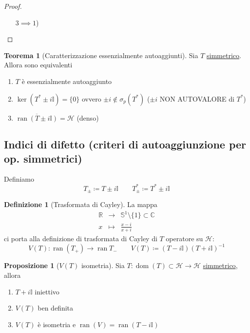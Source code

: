 \documentclass[a4paper,10pt]{article}
\theoremstyle{definition}
\DeclareMathOperator*{\ran}{ran}
\DeclareMathOperator*{\dom}{dom} %
\newcommand{\re}{\mathbb{R}} %
\newcommand{\im}{\mathbb{C}} %
\newcommand{\hil}{\mathcal{H}} %
\theoremstyle{indentdefinition}
\newtheorem{defn}{Definizione}[section]
\theoremstyle{indenttheorem}
\newtheorem{thm}{Teorema}
\newtheorem{prop}{Proposizione}
\theoremstyle{myremark}
\theoremstyle{indentgeneral}
\newenvironment{myboxed} 
{\noindent\begin{lrbox}{\mybox}\begin{minipage}{\textwidth}}
{\end{minipage}\end{lrbox}\fbox{\usebox{\mybox}}}
\begin{document}
\begin{proof}
\begin{itemize}
        \item[$3\implies 1$)] \todo{}
    \end{itemize}
\end{proof}

\begin{thm}[Caratterizzazione essenzialmente autoaggiunti]
    Sia $T$ \underline{simmetrico}. Allora sono equivalenti
    \begin{enumerate}
        \item $T$ è essenzialmente autoaggiunto
        \item $\ker(T^*\pm i\mathbb{I})=\{0\}$ ovvero $\pm i \notin \sigma_p(T^*)$ ($\pm i$ NON AUTOVALORE di $T^*$)
        \item $\overline{\ran(T\pm i\mathbb{I})}=\hil$ (denso)
    \end{enumerate}
\end{thm}

\subsection{Indici di difetto (criteri di autoaggiunzione per op. simmetrici)}
Definiamo
$$T_\pm\coloneqq T\pm i \mathbb{I}\qquad T^*_\pm\coloneqq T^*\pm i \mathbb{I}$$
\begin{defn}[Trasformata di Cayley]
    La mappa 
    $$\begin{array}{ccc}
       \re & \to & \mathbb{S}^1\setminus\{1\}\subset\im   \\
         x&\mapsto & \frac{x-i}{x+i} 
    \end{array}$$
    ci porta alla definizione di trasformata di Cayley di $T$ operatore su $\hil$:
    $$V(T): \ran(T_+)\to\ran T_-\qquad V(T)\coloneqq (T-i\mathbb{I})(T+i\mathbb{I})^{-1}$$
\end{defn}

\begin{myboxed}
    \begin{prop}[$V(T)$ isometria]\label{prop-trasformata-isometria}
        Sia $T:\dom(T)\subset\hil\to \hil$ \underline{simmetrico}, allora
        \begin{enumerate}
            \item $T+i\mathbb{I}$ iniettivo
            \item $V(T)$ ben definita
            \item $V(T)$ è isometria e $\ran(V)=\ran(T-i\mathbb{I})$
        \end{enumerate}
    \end{prop}
\end{myboxed}
\end{document}
